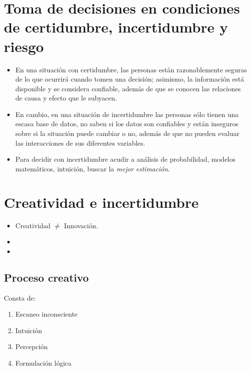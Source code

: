 \documentclass{article}
\begin{document}
\section{Toma de decisiones en condiciones de certidumbre, incertidumbre y riesgo}
\begin{itemize}
    \item En una situación con certidumbre, las personas están razonablemente seguras de lo que ocurrirá cuando tomen una decisión; asimismo, la información está disponible y se considera confiable, además de que se conocen las relaciones de causa y efecto que le subyacen.
    \item En cambio, en una situación de incertidumbre las personas sólo tienen una escasa base de datos, no saben si los datos son confiables y están inseguros sobre si la situación puede cambiar o no, además de que no pueden evaluar las interacciones de sus diferentes variables.
    \item Para decidir con incertidumbre acudir a análisis de probabilidad, modelos matemáticos, intuición, buscar la \emph{mejor estimación}.
\end{itemize}


\section{Creatividad e incertidumbre}
\begin{itemize}
    \item Creatividad $\displaystyle \neq $ Innovación.
    \item {} 
    \item {} 
\end{itemize}


\subsection{Proceso creativo}
Consta de: 
\begin{enumerate}
    \item Escaneo inconsciente 
    \item Intuición 
    \item Percepción 
    \item Formulación lógica
\end{enumerate}
\end{document}
